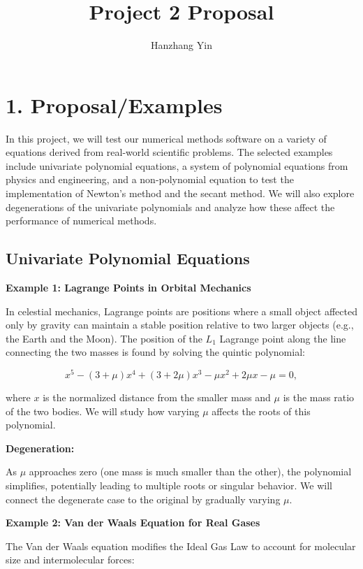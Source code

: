 \documentclass[12pt]{article}
\title{\vspace{-2cm}Project 2 Proposal}
\author{Hanzhang Yin}
\begin{document}
\maketitle

\section*{1. Proposal/Examples}

In this project, we will test our numerical methods software on a variety of equations derived from real-world scientific problems. The selected examples include univariate polynomial equations, a system of polynomial equations from physics and engineering, and a non-polynomial equation to test the implementation of Newton’s method and the secant method. We will also explore degenerations of the univariate polynomials and analyze how these affect the performance of numerical methods.

\subsection*{Univariate Polynomial Equations}

\textbf{Example 1: Lagrange Points in Orbital Mechanics}

In celestial mechanics, Lagrange points are positions where a small object affected only by gravity can maintain a stable position relative to two larger objects (e.g., the Earth and the Moon). The position of the \( L_1 \) Lagrange point along the line connecting the two masses is found by solving the quintic polynomial:

\[
x^5 - (3 + \mu)x^4 + (3 + 2\mu)x^3 - \mu x^2 + 2\mu x - \mu = 0,
\]

where \( x \) is the normalized distance from the smaller mass and \( \mu \) is the mass ratio of the two bodies. We will study how varying \( \mu \) affects the roots of this polynomial.

\textbf{Degeneration:}

As \( \mu \) approaches zero (one mass is much smaller than the other), the polynomial simplifies, potentially leading to multiple roots or singular behavior. We will connect the degenerate case to the original by gradually varying \( \mu \).

\textbf{Example 2: Van der Waals Equation for Real Gases}

The Van der Waals equation modifies the Ideal Gas Law to account for molecular size and intermolecular forces:
\end{document}
